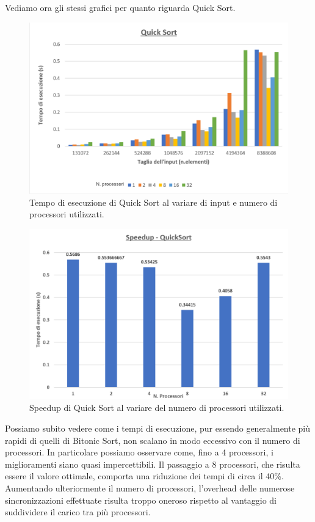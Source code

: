 Vediamo ora gli stessi grafici per quanto riguarda Quick Sort.
\begin{figure}
\centering
\includegraphics[scale=0.35]{images/QuickSort}
\caption{\footnotesize{Tempo di esecuzione di Quick Sort al variare di input e numero di processori utilizzati.}}\label{img.QuickSort}
\end{figure}
\begin{figure}
\centering
\includegraphics[scale=0.35]{images/SpeedupQuick}
\caption{\footnotesize{Speedup di Quick Sort al variare del numero di processori utilizzati.}}\label{img.SpeedupQuick}
\end{figure}
Possiamo subito vedere come i tempi di esecuzione, pur essendo generalmente più rapidi di quelli di Bitonic Sort, non scalano in modo eccessivo con il numero di processori. In particolare possiamo osservare come, fino a 4 processori, i miglioramenti siano quasi impercettibili. Il passaggio a 8 processori, che risulta essere il valore ottimale, comporta una riduzione dei tempi di circa il 40\%. Aumentando ulteriormente il numero di processori, l'overhead delle numerose sincronizzazioni effettuate risulta troppo oneroso rispetto al vantaggio di suddividere il carico tra più processori.

